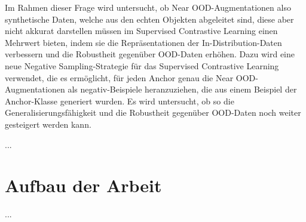 Im Rahmen dieser Frage wird untersucht, ob Near OOD-Augmentationen \textemdash also synthetische Daten, welche aus den echten Objekten abgeleitet sind, diese aber nicht akkurat darstellen müssen \textemdash im Supervised Contrastive Learning einen Mehrwert bieten, indem sie die Repräsentationen der In-Distribution-Daten verbessern und die Robustheit gegenüber OOD-Daten erhöhen. Dazu wird eine neue Negative Sampling-Strategie für das Supervised Contrastive Learning verwendet, die es ermöglicht, für jeden Anchor genau die Near OOD-Augmentationen als negativ-Beispiele heranzuziehen, die aus einem Beispiel der Anchor-Klasse generiert wurden. Es wird untersucht, ob so die Generalisierungsfähigkeit und die Robustheit gegenüber OOD-Daten noch weiter gesteigert werden kann.

...

\section{Aufbau der Arbeit} \label{sec:structure}

...
